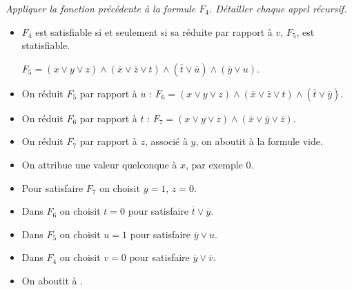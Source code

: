 \begin{Exercise}\it
Appliquer la fonction précédente à la formule $F_4$. Détailler chaque appel récursif.
\end{Exercise}
\begin{Answer}
\begin{itemize}
  \item $F_4$ est satisfiable si et seulement si sa réduite par rapport à $v$, $F_5$, est statisfiable.
  
  $F_5 = (x \lor y \lor z) \land (\overline x \lor \overline z \lor t) \land(\overline t\lor \overline u) \land (\overline y \lor u)$.
  \item On réduit $F_5$ par rapport à $u$ : $F_6 = (x \lor y \lor z) \land (\overline x \lor \overline z \lor t) \land(\overline t\lor \overline y)$.
  
  \item On réduit $F_6$ par rapport à $t$ : $F_7 = (x \lor y \lor z) \land (\overline x \lor \overline y \lor \overline z)$.
  
  \item On réduit $F_7$ par rapport à $z$, associé à $y$, on aboutit à la formule vide.
  
  \item On attribue une valeur quelconque à $x$, par exemple 0.
    
  \item Pour satisfaire $F_7$ on choisit $y =1$, $z = 0$.
  
  \item Dans $F_6$ on choisit $t =0$ pour satisfaire $\overline t\lor \overline y$.
  
  \item Dans $F_5$ on choisit $u =1$ pour satisfaire $\overline y \lor u$.
  
  \item Dans $F_4$ on choisit $v =0$ pour satisfaire $\overline y \lor \overline v$.
  
  \item On aboutit à .
  
\end{itemize}

\end{Answer}
\medskip



